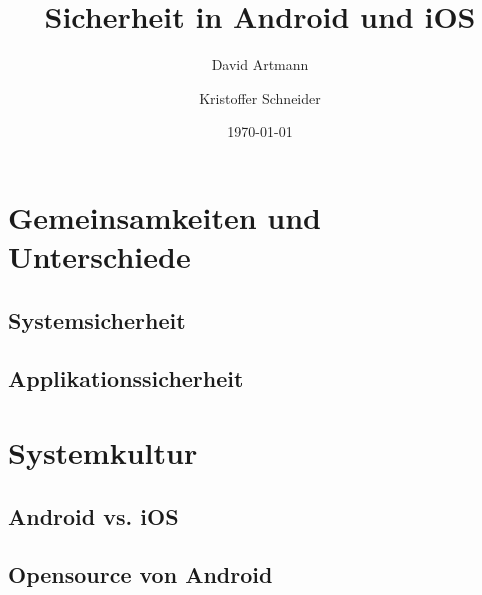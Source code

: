 \documentclass[aspectratio=169]{beamer}
\title{Sicherheit in Android und iOS}
\author{David Artmann\inst{1} \and Kristoffer Schneider\inst{1}}
\institute[Universities of]
{
\inst{1}
Hochschule für angewandte Wissenschaften\\
Würzburg-Schweinfurt
}
\date{\today}
\begin{document}





\section{Gemeinsamkeiten und Unterschiede}
	\subsection[Systemsicherheit]{Systemsicherheit}
		
	\subsection[Applikationssicherheit]{Applikationssicherheit}
		
		
		
		
\section{Systemkultur}
	\subsection{Android vs. iOS}
		
	\subsection{Opensource von Android}
		
		
		
		
		
		
\end{document}
